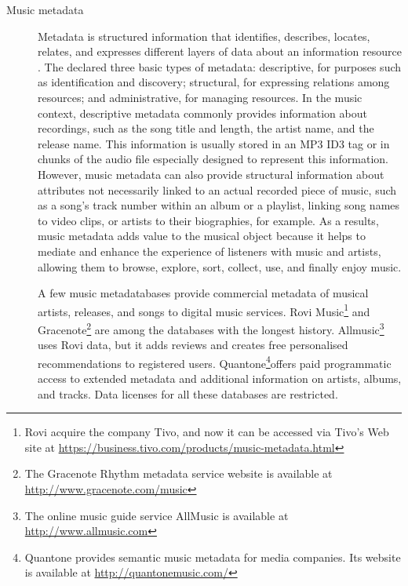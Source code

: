 \begin{description}
\item [Music metadata] Metadata is structured information that identifies, describes, locates, relates, and expresses different layers of data about an information resource \autocite{dcmi12dublin}. The \textcite{niso04understanding} declared three basic types of metadata: descriptive, for purposes such as identification and discovery;  structural, for expressing relations among resources; and administrative, for managing resources. 
In the music context, descriptive metadata commonly provides information about recordings, such as the song title and length, the artist name, and the release name. This information is usually stored in an MP3 ID3 tag or in chunks of the audio file especially designed to represent this information. However, music metadata can also provide structural information about attributes not necessarily linked to an actual recorded piece of music, such as a song's track number within an album or a playlist, linking song names to video clips, or artists to their biographies, for example. 
As a results, music metadata adds value to the musical object because it helps to mediate and enhance the experience of listeners with music and artists, allowing them to browse, explore, sort, collect, use, and finally enjoy music. 

A few music metadatabases provide commercial metadata of musical artists, releases, and songs to digital music services. Rovi Music\footnote{Rovi acquire the company Tivo, and now it can be accessed via Tivo's Web site at \url{https://business.tivo.com/products/music-metadata.html}} and Gracenote\footnote{The Gracenote Rhythm metadata service website is available at \url{http://www.gracenote.com/music}} are among the databases with the longest history. Allmusic\footnote{The online music guide service AllMusic is available at \url{http://www.allmusic.com}} uses Rovi data, but it adds reviews and creates free personalised recommendations to registered users. 
Quantone\footnote{Quantone provides semantic music metadata for media companies. Its website is available at \url{http://quantonemusic.com/}}offers paid programmatic access to extended metadata and additional information on artists, albums, and tracks. 
Data licenses for all these databases are restricted. 


\end{description}
